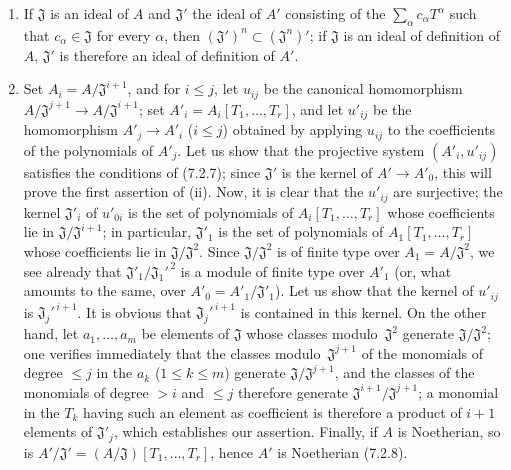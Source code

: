 \begin{enumerate}
  \item[(i)] If $\mathfrak J$ is an ideal of $A$ and $\mathfrak J'$ the ideal of
  $A'$ consisting of the $\sum_\alpha c_\alpha T^\alpha$ such that
  $c_\alpha\in\mathfrak J$ for every $\alpha$, then
  $(\mathfrak J')^n\subset(\mathfrak J^n)'$; if $\mathfrak J$ is an ideal of
  definition of $A$, $\mathfrak J'$ is therefore an ideal of definition of $A'$.

  \item[(ii)] Set $A_i=A/\mathfrak J^{i+1}$, and for $i\leq j$, let
  $u_{ij}$ be the canonical homomorphism
  $A/\mathfrak J^{j+1}\to A/\mathfrak J^{i+1}$; set
  $A'_i=A_i[T_1,\ldots,T_r]$, and let $u'_{ij}$ be the homomorphism
  $A'_j\to A'_i$ ($i\leq j$) obtained by applying $u_{ij}$ to the coefficients
  of the polynomials of $A'_j$. Let us show that the projective system
  $(A'_i,u'_{ij})$ satisfies the conditions of (7.2.7); since $\mathfrak J'$ is
  the kernel of $A'\to A'_0$, this will prove the first assertion of (ii). Now,
  it is clear that the $u'_{ij}$ are surjective; the kernel $\mathfrak J'_i$
  of $u'_{0i}$ is the set of polynomials of
  $A_i[T_1,\ldots,T_r]$ whose coefficients lie in
  $\mathfrak J/\mathfrak J^{i+1}$; in particular, $\mathfrak J'_1$ is
  the set of polynomials of $A_1[T_1,\ldots,T_r]$ whose coefficients
  lie in $\mathfrak J/\mathfrak J^2$. Since $\mathfrak J/\mathfrak J^2$
  is of finite type over $A_1=A/\mathfrak J^2$, we see already that
  $\mathfrak J'_1/\mathfrak J_1'^{\,2}$ is a module of finite type over $A'_1$
  (or, what amounts to the same, over
  $A'_0=A'_1/\mathfrak J'_1$). Let us show that the kernel of $u'_{ij}$ is
  $\mathfrak J_j'^{\,i+1}$. It is obvious that
  $\mathfrak J_j'^{\,i+1}$ is contained in this kernel. On the other hand, let
  $a_1,\ldots,a_m$ be elements of $\mathfrak J$ whose classes
  modulo~$\mathfrak J^2$ generate $\mathfrak J/\mathfrak J^2$; one verifies
  immediately that the classes modulo~$\mathfrak J^{j+1}$ of the monomials of degree
  $\leq j$ in the $a_k$ ($1\leq k\leq m$) generate
  $\mathfrak J/\mathfrak J^{j+1}$, and the classes of the monomials of degree $>i$
  and $\leq j$ therefore generate
  $\mathfrak J^{i+1}/\mathfrak J^{j+1}$; a monomial in the $T_k$ having such an
  element as coefficient is therefore a product of $i+1$ elements of
  $\mathfrak J'_j$, which establishes our assertion. Finally, if $A$ is
  Noetherian, so is
  $A'/\mathfrak J'=(A/\mathfrak J)[T_1,\ldots,T_r]$, hence $A'$ is Noetherian
  (7.2.8).
\end{enumerate}


